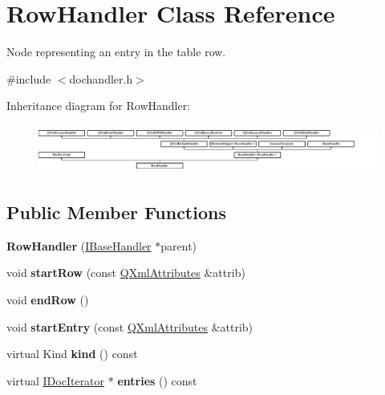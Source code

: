 \hypertarget{class_row_handler}{}\section{Row\+Handler Class Reference}
\label{class_row_handler}


Node representing an entry in the table row.  




{\ttfamily \#include $<$dochandler.\+h$>$}

Inheritance diagram for Row\+Handler\+:\begin{figure}[H]
\begin{center}
\leavevmode
\includegraphics[height=1.592040cm]{class_row_handler}
\end{center}
\end{figure}
\subsection*{Public Member Functions}
\begin{DoxyCompactItemize}
\item 
\mbox{\label{class_row_handler_a056f065d6449f657e8450f939fd3bdc2}} 
{\bfseries Row\+Handler} (\mbox{\hyperlink{class_i_base_handler}{I\+Base\+Handler}} $\ast$parent)
\item 
\mbox{\label{class_row_handler_af9aca4eea359ccc5e89a6c3bf8d3e1d5}} 
void {\bfseries start\+Row} (const \mbox{\hyperlink{class_q_xml_attributes}{Q\+Xml\+Attributes}} \&attrib)
\item 
\mbox{\label{class_row_handler_ad9a551daed8cdce1480df0552ae93fb5}} 
void {\bfseries end\+Row} ()
\item 
\mbox{\label{class_row_handler_adf9d15b99e9863d287a936d7dc6cc58b}} 
void {\bfseries start\+Entry} (const \mbox{\hyperlink{class_q_xml_attributes}{Q\+Xml\+Attributes}} \&attrib)
\item 
\mbox{\label{class_row_handler_aa6af348eaec8b908fe641e653c963c89}} 
virtual Kind {\bfseries kind} () const
\item 
\mbox{\label{class_row_handler_a73b82d23bf5bd9bebbe89550d5ace962}} 
virtual \mbox{\hyperlink{class_i_doc_iterator}{I\+Doc\+Iterator}} $\ast$ {\bfseries entries} () const
\end{DoxyCompactItemize}
